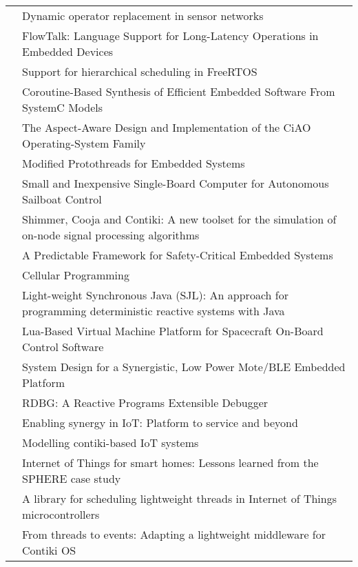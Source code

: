 \begin{longtable}[c]{ l p{8cm} }
\cite{Strube2010} & Dynamic operator replacement in sensor networks \\
\cite{Bergel2011} & FlowTalk: Language Support for Long-Latency Operations in Embedded Devices \\
\cite{Inam2011} & Support for hierarchical scheduling in FreeRTOS \\
\cite{Liu2011} & Coroutine-Based Synthesis of Efficient Embedded Software From SystemC Models \\
\cite{Lohmann2012} & The Aspect-Aware Design and Implementation of the CiAO Operating-System Family \\
\cite{Schimpf2012b} & Modified Protothreads for Embedded Systems \\
\cite{Alvira2013} & Small and Inexpensive Single-Board Computer for Autonomous Sailboat Control \\
\cite{Kugler2013} & Shimmer, Cooja and Contiki: A new toolset for the simulation of on-node signal processing algorithms \\
\cite{Andalam2014} & A Predictable Framework for Safety-Critical Embedded Systems \\
\cite{Niebert2014} & Cellular Programming \\
\cite{Motika2015} & Light-weight Synchronous Java (SJL): An approach for programming deterministic reactive systems with Java \\
\cite{Park2015} & Lua-Based Virtual Machine Platform for Spacecraft On-Board Control Software \\
\cite{Andersen2016} & System Design for a Synergistic, Low Power Mote/BLE Embedded Platform \\
\cite{Jahier2016} & RDBG: A Reactive Programs Extensible Debugger \\
\cite{Andersen2017b} & Enabling synergy in IoT: Platform to service and beyond \\
\cite{Durmaz2017} & Modelling contiki-based IoT systems \\
\cite{Elsts2017} & Internet of Things for smart homes: Lessons learned from the SPHERE case study \\
\cite{Kalebe2017} & A library for scheduling lightweight threads in Internet of Things microcontrollers \\
\cite{Noman2017} & From threads to events: Adapting a lightweight middleware for Contiki OS \\
\hline
\end{longtable}

\fi

